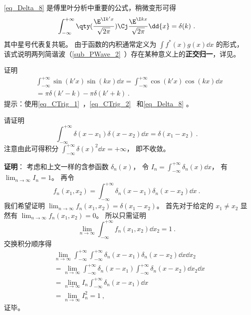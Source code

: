 \autoref{eq_Delta_8} 是傅里叶分析中重要的公式，稍微变形可得
\begin{equation}
\int_{-\infty}^{+\infty} \qty(\frac{\E^{\I k'x}}{\sqrt{2\pi}})\Cj \frac{\E^{\I kx}}{\sqrt{2\pi}}\dd{x} = \delta(k)~.
\end{equation}
其中星号代表复共轭。 由于函数的内积通常定义为 $\int f^*(x) g(x) \dd{x}$ 的形式， 该式说明两列简谐波（\autoref{sub_PWave_2}~）存在某种意义上的\textbf{正交归一}，详见。

\begin{exercise}{}\label{exe_Delta_3}
证明
\begin{equation}\label{eq_Delta_9}
\begin{aligned}%
&\int_{-\infty}^{+\infty} \sin(k'x) \sin(kx) \dd{x} = \int_{-\infty}^{+\infty} \cos(k'x) \cos(kx) \dd{x}\\
&= \pi\delta(k' - k) - \pi\delta(k' + k)~.
\end{aligned}
\end{equation}
提示：使用\autoref{eq_CTrig_1}~，\autoref{eq_CTrig_2}~ 和\autoref{eq_Delta_8} 。
\end{exercise}

\begin{example}{}
请证明
\begin{equation}\label{eq_Delta_13}
\int_{-\infty}^{+\infty} \delta(x-x_1) \delta(x-x_2) \dd{x} = \delta(x_1 - x_2)~.
\end{equation}
注意由此可得积分 $\int_{-\infty}^{+\infty}\delta(x)^2 \dd{x} = +\infty$， 即不收敛。

\textbf{证明}： 考虑和上文一样的含参函数 $\delta_n(x)$， 令 $I_n = \int_{-\infty}^{+\infty} \delta_n(x) \dd{x}$， 有 $\lim_{n\to\infty} I_n = 1$。 再令
\begin{equation}
f_n(x_1, x_2) = \int_{-\infty}^{+\infty} \delta_n(x-x_1) \delta_n(x-x_2) \dd{x}~.
\end{equation}
我们希望证明 $\lim_{n\to\infty }f_n(x_1, x_2) = \delta(x_1 - x_2)$。 首先对于给定的 $x_1 \ne x_2$ 显然有 $\lim_{n\to\infty }f_n(x_1, x_2) = 0$。 所以只需证明
\begin{equation}
\lim_{n\to\infty }\int_{-\infty}^{+\infty} f_n(x_1, x_2) \dd{x_2} = 1~.
\end{equation}
交换积分顺序得
\begin{equation}
\begin{aligned}
&\lim_{n\to\infty }\int_{-\infty}^{+\infty}\int_{-\infty}^{+\infty} \delta_n(x-x_1) \delta_n(x-x_2) \dd{x}\dd{x_2}\\
&= \lim_{n\to\infty }\int_{-\infty}^{+\infty} \delta_n(x-x_1) \int_{-\infty}^{+\infty} \delta_n(x-x_2)\dd{x_2} \dd{x}\\
&= \lim_{n\to\infty } I_n \int_{-\infty}^{+\infty} \delta_n(x-x_1)\dd{x}\\
&= \lim_{n\to\infty } I_n^2 = 1~,
\end{aligned}
\end{equation}
证毕。
\end{example}

